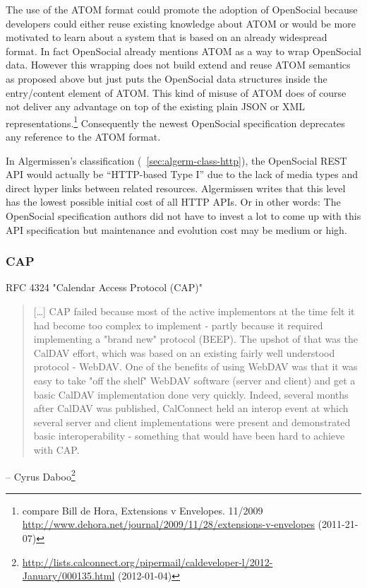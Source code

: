 \documentclass[12pt,a4paper]{scrartcl}		%
\newcommand{\citeurl}[2]{\url{#1} (#2)}
\begin{document}
The use of the ATOM format could promote the adoption of OpenSocial because
developers could either reuse existing knowledge about ATOM or would be more
motivated to learn about a system that is based on an already widespread
format. In fact OpenSocial already mentions ATOM as a way to wrap OpenSocial
data. However this wrapping does not build extend and reuse ATOM semantics as
proposed above but just puts the OpenSocial data structures inside the
entry/content element of ATOM. This kind of misuse of ATOM does of course not
deliver any advantage on top of the existing plain JSON or XML
representations.\footnote{compare Bill de Hora, Extensions v Envelopes. 11/2009 
  \citeurl{http://www.dehora.net/journal/2009/11/28/extensions-v-envelopes}{2011-21-07}}
Consequently the newest OpenSocial specification deprecates any reference to the
ATOM format.

In Algermissen's classification (~\ref{sec:algerm-class-http}), the OpenSocial
REST API would actually be ``HTTP-based Type I'' due to the lack of media types
and direct hyper links between related resources. Algermissen writes that this
level has the lowest possible initial cost of all HTTP APIs. Or in other words:
The OpenSocial specification authors did not have to invest a lot to come up
with this API specification but maintenance and evolution cost may be medium or
high.

\subsubsection{CAP}

RFC 4324 "Calendar Access Protocol (CAP)"

\begin{quotation}
  [\ldots] CAP failed because most of the active implementors at the 
time felt it had become too complex to implement - partly because it 
required implementing a "brand new" protocol (BEEP). The upshot of that was 
the CalDAV effort, which was based on an existing fairly well understood 
protocol - WebDAV. One of the benefits of using WebDAV was that it was easy 
to take "off the shelf" WebDAV software (server and client) and get a basic 
CalDAV implementation done very quickly. Indeed, several months after 
CalDAV was published, CalConnect held an interop event at which several 
server and client implementations were present and demonstrated basic 
interoperability - something that would have been hard to achieve with CAP.
\end{quotation}
-- Cyrus Daboo\footnote{\citeurl{http://lists.calconnect.org/pipermail/caldeveloper-l/2012-January/000135.html}{2012-01-04}}
\end{document}
